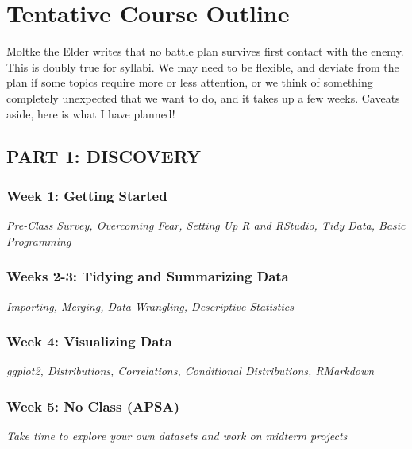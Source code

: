 \documentclass[11pt, letterpaper]{article}
\begin{document}
\section*{Tentative Course Outline}

Moltke the Elder writes that no battle plan survives first contact with the enemy. This is doubly true for syllabi. We may need to be flexible, and deviate from the plan if some topics require more or less attention, or we think of something completely unexpected that we want to do, and it takes up a few weeks. Caveats aside, here is what I have planned! %

\subsection*{PART 1: DISCOVERY}

\subsubsection*{Week 1: Getting Started}
\textit{Pre-Class Survey, Overcoming Fear, Setting Up R and RStudio, Tidy Data, Basic Programming}

\subsubsection*{Weeks 2-3: Tidying and Summarizing Data}
\textit{Importing, Merging, Data Wrangling, Descriptive Statistics}

\subsubsection*{Week 4: Visualizing Data}
\textit{ggplot2, Distributions, Correlations, Conditional Distributions, RMarkdown}

\subsubsection*{Week 5: No Class (APSA)}
\textit{Take time to explore your own datasets and work on midterm projects}
\end{document}
